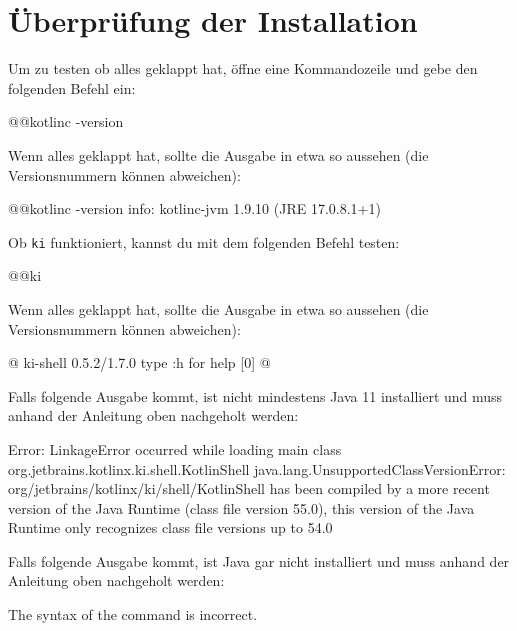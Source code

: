 \section*{Überprüfung der Installation}\label{sec:check}
Um zu testen ob alles geklappt hat, öffne eine Kommandozeile und gebe den folgenden Befehl ein:
\begin{commandshell}
    @\shellprefix{}@kotlinc -version
\end{commandshell}

Wenn alles geklappt hat, sollte die Ausgabe in etwa so aussehen (die Versionsnummern können abweichen):
\begin{commandshell}[][]
    @\shellprefix{}@kotlinc -version
    info: kotlinc-jvm 1.9.10 (JRE 17.0.8.1+1)
\end{commandshell}

Ob \texttt{ki} funktioniert, kannst du mit dem folgenden Befehl testen:
\begin{commandshell}
    @\shellprefix{}@ki
\end{commandshell}
Wenn alles geklappt hat, sollte die Ausgabe in etwa so aussehen (die Versionsnummern können abweichen):
\begin{commandshell}[][minted language=text]
    @\shellprefix@ki
    ki-shell 0.5.2/1.7.0
    type :h for help
    [0] @\shellcursor@
\end{commandshell}
Falls folgende Ausgabe kommt, ist nicht mindestens Java 11 installiert und muss anhand der Anleitung oben nachgeholt werden:
\nopagebreak
\begin{commandshell}[][minted language=text]
Error: LinkageError occurred while loading main class org.jetbrains.kotlinx.ki.shell.KotlinShell
        java.lang.UnsupportedClassVersionError: org/jetbrains/kotlinx/ki/shell/KotlinShell has been compiled by a more recent version of the Java Runtime (class file version 55.0), this version of the Java Runtime only recognizes class file versions up to 54.0
\end{commandshell}
Falls folgende Ausgabe kommt, ist Java gar nicht installiert und muss anhand der Anleitung oben nachgeholt werden:
\nopagebreak
\begin{commandshell}[][minted language=text]
The syntax of the command is incorrect.
\end{commandshell}


